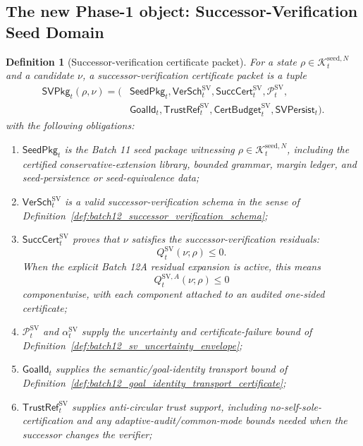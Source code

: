 \documentclass[11pt]{article}
\newtheorem{definition}[theorem]{Definition}
\newcommand{\Pcal}{\mathcal{P}}
\newcommand{\1}{\mathbf{1}}
\providecommand{\Kcal}{\mathcal{K}}
\begin{document}
\subsection{The new Phase-1 object: Successor-Verification Seed Domain}

\begin{definition}[Successor-verification certificate packet]
\label{def:batch12_successor_verification_packet}
For a state \(\rho\in\Kcal_t^{\mathrm{seed},N}\) and a candidate \(\nu\), a successor-verification certificate packet is a tuple
\[
\begin{aligned}
\mathsf{SVPkg}_t(\rho,\nu)
=
(&\mathsf{SeedPkg}_t,
\mathsf{VerSch}_t^{\mathrm{SV}},
\mathsf{SuccCert}_t^{\mathrm{SV}},
\Pcal_t^{\mathrm{SV}},\\
&\mathsf{GoalId}_t,
\mathsf{TrustRef}_t^{\mathrm{SV}},
\mathsf{CertBudget}_t^{\mathrm{SV}},
\mathsf{SVPersist}_t).
\end{aligned}
\]
with the following obligations:
\begin{enumerate}[label=(\roman*),leftmargin=1.5em]
    \item \(\mathsf{SeedPkg}_t\) is the Batch 11 seed package witnessing \(\rho\in\Kcal_t^{\mathrm{seed},N}\), including the certified conservative-extension library, bounded grammar, margin ledger, and seed-persistence or seed-equivalence data;
    \item \(\mathsf{VerSch}_t^{\mathrm{SV}}\) is a valid successor-verification schema in the sense of Definition~\ref{def:batch12_successor_verification_schema};
    \item \(\mathsf{SuccCert}_t^{\mathrm{SV}}\) proves that \(\nu\) satisfies the successor-verification residuals:
    \[
    Q_t^{\mathrm{SV}}(\nu;\rho)\le0.
    \]
    When the explicit Batch 12A residual expansion is active, this means
    \[
    Q_t^{\mathrm{SV},A}(\nu;\rho)\le0
    \]
    componentwise, with each component attached to an audited one-sided certificate;
    \item \(\Pcal_t^{\mathrm{SV}}\) and \(\alpha_t^{\mathrm{SV}}\) supply the uncertainty and certificate-failure bound of Definition~\ref{def:batch12_sv_uncertainty_envelope};
    \item \(\mathsf{GoalId}_t\) supplies the semantic/goal-identity transport bound of Definition~\ref{def:batch12_goal_identity_transport_certificate};
    \item \(\mathsf{TrustRef}_t^{\mathrm{SV}}\) supplies anti-circular trust support, including no-self-sole-certification and any adaptive-audit/common-mode bounds needed when the successor changes the verifier;

\end{enumerate}
\end{definition}
\end{document}
